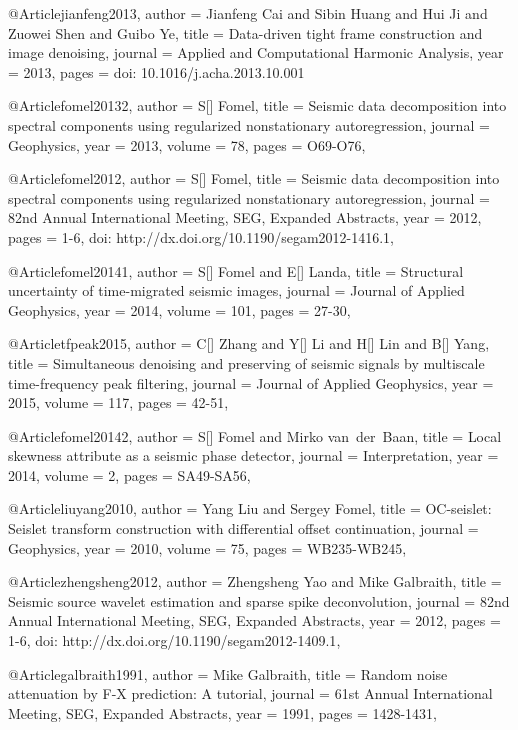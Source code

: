 @Article{jianfeng2013,
  author = 	 {Jianfeng Cai and Sibin Huang and Hui Ji and Zuowei Shen and Guibo Ye},
  title = 	 {Data-driven tight frame construction and image denoising},
  journal = 	 {Applied and Computational Harmonic Analysis},
  year = 	 2013,
  pages = 	 {doi: 10.1016/j.acha.2013.10.001}}

@Article{fomel20132,
  author = 	 {S[] Fomel},
  title = 	 {Seismic data decomposition into spectral components using regularized nonstationary autoregression},
  journal = 	 {Geophysics},
  year = 	 2013,
  volume =	 78,
  pages =	 {O69-O76},
}

@Article{fomel2012,
  author = 	 {S[] Fomel},
  title = 	 {Seismic data decomposition into spectral components using regularized nonstationary autoregression},
  journal = 	 {82nd Annual International Meeting, SEG, Expanded Abstracts},
  year = 	 2012,
  pages =	 {1-6, doi: http://dx.doi.org/10.1190/segam2012-1416.1},
}


@Article{fomel20141,
  author = 	 {S[] Fomel and E[] Landa},
  title = 	 {Structural uncertainty of time-migrated seismic images},
  journal = 	 {Journal of Applied Geophysics},
  year = 	 2014,
  volume =	 101,
  pages =	 {27-30},
}

@Article{tfpeak2015,
  author = 	 {C[] Zhang and Y[] Li and H[] Lin and B[] Yang},
  title = 	 {Simultaneous denoising and preserving of seismic signals by multiscale time-frequency peak filtering},
  journal = 	 {Journal of Applied Geophysics},
  year = 	 2015,
  volume =	 117,
  pages =	 {42-51},
}


@Article{fomel20142,
  author = 	 {S[] Fomel and Mirko van~der~Baan},
  title = 	 {Local skewness attribute as a seismic phase detector},
  journal = 	 {Interpretation},
  year = 	 2014,
  volume =	 2,
  pages =	 {SA49-SA56},
}

@Article{liuyang2010,
  author = 	 {Yang Liu and Sergey Fomel},
  title = 	 {OC-seislet: Seislet transform construction with differential offset continuation},
  journal = 	 {Geophysics},
  year = 	 2010,
  volume =	 75,
  pages =	 {WB235-WB245},
}

@Article{zhengsheng2012,
  author = 	 {Zhengsheng Yao and Mike Galbraith},
  title = 	 {Seismic source wavelet estimation and sparse spike deconvolution},
  journal = 	 {82nd Annual International Meeting, SEG, Expanded Abstracts},
  year = 	 2012,
  pages =	 {1-6, doi: http://dx.doi.org/10.1190/segam2012-1409.1},
}

@Article{galbraith1991,
  author = 	 {Mike Galbraith},
  title = 	 {Random noise attenuation by {F}-{X} prediction: A tutorial},
  journal = 	 {61st Annual International Meeting, SEG, Expanded Abstracts},
  year = 	 1991,
  pages =	 {1428-1431},
}

